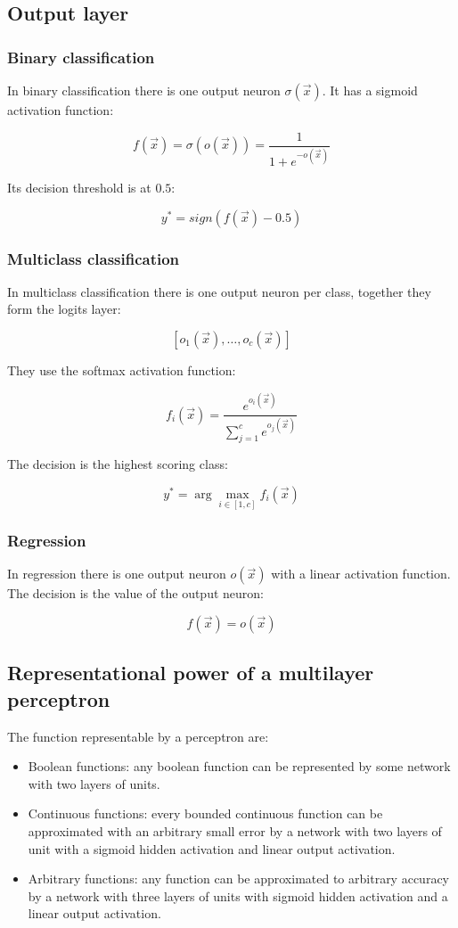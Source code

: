 	\subsection{Output layer}

		\subsubsection{Binary classification}
		In binary classification there is one output neuron $\sigma(\vec{x})$.
		It has a sigmoid activation function:

		$$f(\vec{x}) = \sigma(o(\vec{x})) = \frac{1}{1+e^{-o(\vec{x})}}$$

		Its decision threshold is at $0.5$:

		$$y^* = sign(f(\vec{x}) - 0.5)$$

		\subsubsection{Multiclass classification}
		In multiclass classification there is one output neuron per class, together they form the logits layer:

		$$[o_1(\vec{x}),\dots, o_c(\vec{x})]$$

		They use the softmax activation function:

		$$f_i(\vec{x}) = \frac{e^{o_i(\vec{x})}}{\sum\limits_{j=1}^ce^{o_j(\vec{x})}}$$

		The decision is the highest scoring class:

		$$y^* = \arg\max\limits_{i\in[1,c]}f_i(\vec{x})$$

		\subsubsection{Regression}
		In regression there is one output neuron $o(\vec{x})$ with a linear activation function.
		The decision is the value of the output neuron:

		$$f(\vec{x}) = o(\vec{x})$$

	\subsection{Representational power of a multilayer perceptron}
	The function representable by a perceptron are:

	\begin{multicols}{2}
		\begin{itemize}
			\item Boolean functions: any boolean function can be represented by some network with two layers of units.
			\item Continuous functions: every bounded continuous function can be approximated with an arbitrary small error by a network with two layers of unit with a sigmoid hidden activation and linear output activation.

			\item Arbitrary functions: any function can be approximated to arbitrary accuracy by a network with three layers of units with sigmoid hidden activation and a linear output activation.
		\end{itemize}
	\end{multicols}

